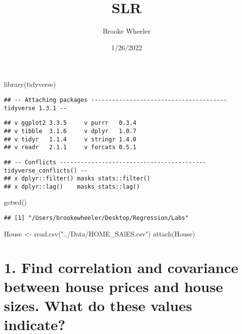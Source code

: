 \documentclass[
]{article}
\title{SLR}
\author{Brooke Wheeler}
\date{1/26/2022}
\newenvironment{Shaded}{\begin{snugshade}}{\end{snugshade}}
\newcommand{\FunctionTok}[1]{\textcolor[rgb]{0.00,0.00,0.00}{#1}}
\newcommand{\NormalTok}[1]{#1}
\newcommand{\OtherTok}[1]{\textcolor[rgb]{0.56,0.35,0.01}{#1}}
\newcommand{\StringTok}[1]{\textcolor[rgb]{0.31,0.60,0.02}{#1}}
\begin{document}
\maketitle

\begin{Shaded}
\begin{Highlighting}[]
\FunctionTok{library}\NormalTok{(tidyverse)}
\end{Highlighting}
\end{Shaded}

\begin{verbatim}
## -- Attaching packages --------------------------------------- tidyverse 1.3.1 --
\end{verbatim}

\begin{verbatim}
## v ggplot2 3.3.5     v purrr   0.3.4
## v tibble  3.1.6     v dplyr   1.0.7
## v tidyr   1.1.4     v stringr 1.4.0
## v readr   2.1.1     v forcats 0.5.1
\end{verbatim}

\begin{verbatim}
## -- Conflicts ------------------------------------------ tidyverse_conflicts() --
## x dplyr::filter() masks stats::filter()
## x dplyr::lag()    masks stats::lag()
\end{verbatim}

\begin{Shaded}
\begin{Highlighting}[]
\FunctionTok{getwd}\NormalTok{()}
\end{Highlighting}
\end{Shaded}

\begin{verbatim}
## [1] "/Users/brookewheeler/Desktop/Regression/Labs"
\end{verbatim}

\begin{Shaded}
\begin{Highlighting}[]
\NormalTok{House }\OtherTok{\textless{}{-}} \FunctionTok{read.csv}\NormalTok{(}\StringTok{"../Data/HOME\_SAlES.csv"}\NormalTok{)}
\FunctionTok{attach}\NormalTok{(House)}
\end{Highlighting}
\end{Shaded}

\hypertarget{find-correlation-and-covariance-between-house-prices-and-house-sizes.-what-do-these-values-indicate}{%
\section{1. Find correlation and covariance between house prices and
house sizes. What do these values
indicate?}\label{find-correlation-and-covariance-between-house-prices-and-house-sizes.-what-do-these-values-indicate}}
\end{document}
